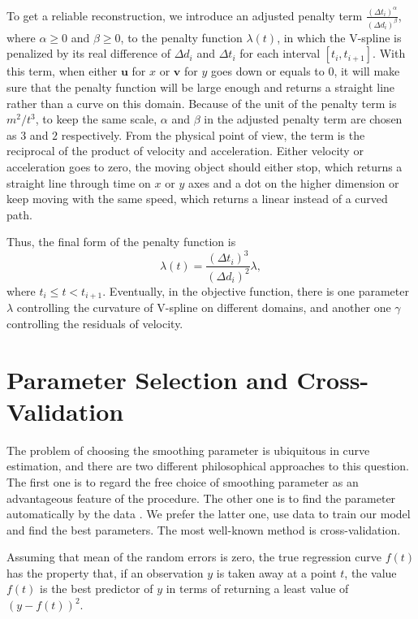 To get a reliable reconstruction, we introduce an adjusted penalty term $\frac{\left(\Delta t_i\right)^\alpha}{\left(\Delta d_i\right)^\beta}$, where $\alpha \ge 0$ and $\beta \ge 0$, to the penalty function $\lambda(t)$, in which the V-spline is penalized by its real difference of $\Delta d_i$ and $\Delta t_i$ for each interval $[t_i, t_{i+1}]$. With this term, when either $\mathbf{u}$ for $x$ or $\mathbf{v}$ for $y$ goes down or equals to 0, it will make sure that the penalty function will be large enough and returns a straight line rather than a curve on this domain. Because of the unit of the penalty term is $m^2/t^3$, to keep the same scale, $\alpha$ and $\beta$ in the adjusted penalty term are chosen as $3$ and $2$ respectively. From the physical point of view, the term is the reciprocal of the product of velocity and acceleration. Either velocity or acceleration goes to zero, the moving object should either stop, which returns a straight line through time on $x$ or $y$ axes and a dot on the higher dimension or keep moving with the same speed, which returns a linear instead of a curved path. 

Thus, the final form of the penalty function is 
\begin{equation}\label{adjustedpenalty}
\lambda(t)=\frac{\left(\Delta t_i\right)^3}{\left(\Delta d_i\right)^2}\lambda,
\end{equation}
where  $t_i\leq t < t_{i+1}$. Eventually, in the objective function, there is one parameter $\lambda$ controlling the curvature of V-spline on different domains, and another one $\gamma$ controlling the residuals of velocity. 




\section{Parameter Selection and Cross-Validation}

The problem of choosing the smoothing parameter is ubiquitous in curve estimation, and there are two different philosophical approaches to this question. The first one is to regard the free choice of smoothing parameter as an advantageous feature of the procedure. The other one is to find the parameter automatically by the data \citep{green1993nonparametric}. We prefer the latter one, use data to train our model and find the best parameters. The most well-known method is cross-validation.


Assuming that mean of the random errors is zero, the true regression curve $f(t)$ has the property that, if an observation $y$ is taken away at a point $t$, the value $f(t)$ is the best predictor of $y$ in terms of returning a least value of $\left(y-f(t)\right)^2$. 

